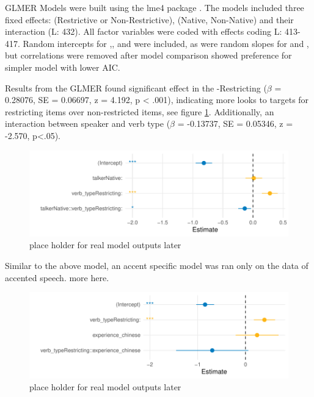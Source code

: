 

GLMER Models were built using the lme4 package \parencite{Bates2014-eq}. The models included three fixed effects:  (Restrictive or Non-Restrictive), (Native, Non-Native) and their interaction (L: 432). All factor variables were coded with
effects coding L: 413-417. Random intercepts for ,, and
 were included, as were random slopes for  and , but correlations were removed after model comparison showed preference for simpler model with lower AIC.



Results from the GLMER found significant effect in the -Restricting  ($\beta$ = 0.28076, SE = 0.06697, z = 4.192, p < .001), indicating more looks to targets for restricting items over non-restricted items, see figure \ref{fig:GLMER_base_model}. Additionally, an interaction between speaker and verb type ($\beta$ = -0.13737, SE = 0.05346, z = -2.570, p<.05). 

\begin{figure}[h]
    \centering
    \includegraphics[width=\textwidth]{figures/GLMER_base_model.pdf}
    \caption{place holder for real model outputs later}
    \label{fig:GLMER_base_model}
\end{figure}
 
 Similar to the above model, an accent specific model was ran only on the data of accented speech. more here.
 
\begin{figure}[h]
    \centering
    \includegraphics[width=\textwidth]{figures/GLMER_accent_model.pdf}
    \caption{place holder for real model outputs later}
    \label{fig:GLMER_accent_model}
\end{figure}

